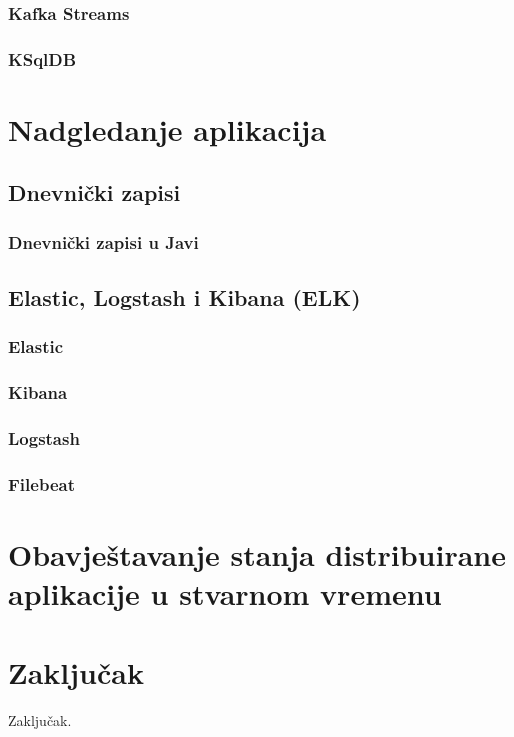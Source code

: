 \documentclass[times, utf8, diplomski]{fer}
\begin{document}
\subsection{Kafka Streams}

\subsection{KSqlDB}

\chapter{Nadgledanje aplikacija}

\section{Dnevnički zapisi}
\label{sec:logs}
\subsection{Dnevnički zapisi u Javi}

\section{Elastic, Logstash i Kibana (ELK)}

\subsection{Elastic}

\subsection{Kibana}

\subsection{Logstash}

\subsection{Filebeat}

\chapter{Obavještavanje stanja distribuirane aplikacije u stvarnom vremenu}

\chapter{Zaključak}
Zaključak.
\end{document}
